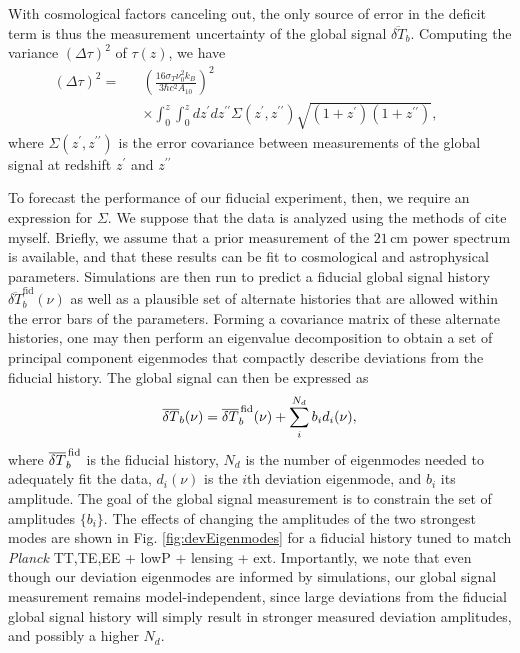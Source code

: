 \documentclass[twocolumn,aps,prd,nofootinbib,showpacs]{revtex4-1}
\begin{document}
With cosmological factors canceling out, the only source of error in the deficit term is thus the measurement uncertainty of the global signal $\overline{\delta T}_b$. Computing the variance $(\Delta \tau)^2$ of $\tau(z)$, we have
\begin{eqnarray}
\label{eq:DeltaTauDoubleIntegral}
(\Delta \tau)^2 = &&\left( \frac{16 \sigma_T \nu_0^2 k_B}{3 \hbar c^2 A_{10}} \right)^2 \nonumber \\
&&\times \int_0^z \! \!\int_0^z dz^\prime dz^{\prime \prime} \Sigma (z^\prime, z^{\prime \prime}) \sqrt{(1+z^\prime) (1+z^{\prime \prime})}, \qquad
\end{eqnarray}
where $\Sigma (z^\prime, z^{\prime \prime})$ is the error covariance between measurements of 
the global signal at redshift $z^\prime$ and $z^{\prime \prime}$

To forecast the performance of our fiducial experiment, then, we require an expression for $\Sigma$. We suppose that the data is analyzed using the methods of \acl{cite myself}. Briefly, we assume that a prior measurement of the $21\,\textrm{cm}$ power spectrum is available, and that these results can be fit to cosmological and astrophysical parameters. Simulations are then run to predict a fiducial global signal history $\overline{\delta T}_b^\textrm{fid} (\nu)$ as well as a plausible set of alternate histories that are allowed within the error bars of the parameters. Forming a covariance matrix of these alternate histories, one may then perform an eigenvalue decomposition to obtain a set of principal component eigenmodes that compactly describe deviations from the fiducial history. The global signal can then be expressed as
\begin{equation}
\overline{\delta T}_b (\nu) = \overline{\delta T}_b^\textrm{\,fid} (\nu) + \sum_i^{N_d} b_i d_i (\nu),
\end{equation}
where $\overline{\delta T}_b^\textrm{\,fid}$ is the fiducial history, $N_d$ is the number of eigenmodes needed to adequately fit the data, $d_i (\nu)$ is the $i$th deviation eigenmode, and $b_i$ its amplitude. The goal of the global signal measurement is to constrain the set of amplitudes $\{ b_i \}$. The effects of changing the amplitudes of the two strongest modes are shown in Fig. \ref{fig:devEigenmodes} for a fiducial history tuned to match \emph{Planck} TT,TE,EE + lowP + lensing + ext. Importantly, we note that even though our deviation eigenmodes are informed by simulations, our global signal measurement remains model-independent, since large deviations from the fiducial global signal history will simply result in stronger measured deviation amplitudes, and possibly a higher $N_d$.
\end{document}
